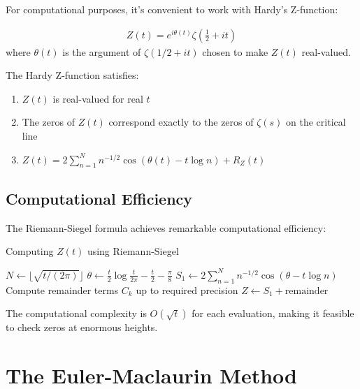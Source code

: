 For computational purposes, it's convenient to work with Hardy's Z-function:

\begin{definition}
\begin{align}
Z(t) = e^{i\theta(t)} \zeta\left(\frac{1}{2} + it\right)
\end{align}
where $\theta(t)$ is the argument of $\zeta(1/2 + it)$ chosen to make $Z(t)$ real-valued.
\end{definition}

\begin{theorem}
The Hardy Z-function satisfies:
\begin{enumerate}
\item $Z(t)$ is real-valued for real $t$
\item The zeros of $Z(t)$ correspond exactly to the zeros of $\zeta(s)$ on the critical line
\item $Z(t) = 2\sum_{n=1}^{N} n^{-1/2} \cos(\theta(t) - t\log n) + R_Z(t)$
\end{enumerate}
\end{theorem}

\subsection{Computational Efficiency}

The Riemann-Siegel formula achieves remarkable computational efficiency:

\begin{algorithm}[H]
\caption{Computing $Z(t)$ using Riemann-Siegel}
\begin{algorithmic}
\State $N \leftarrow \lfloor\sqrt{t/(2\pi)}\rfloor$
\State $\theta \leftarrow \frac{t}{2}\log\frac{t}{2\pi} - \frac{t}{2} - \frac{\pi}{8}$
\State $S_1 \leftarrow 2\sum_{n=1}^{N} n^{-1/2} \cos(\theta - t\log n)$
\State Compute remainder terms $C_k$ up to required precision
\State $Z \leftarrow S_1 + \text{remainder}$
\end{algorithmic}
\end{algorithm}

The computational complexity is $O(\sqrt{t})$ for each evaluation, making it feasible to check zeros at enormous heights.

\section{The Euler-Maclaurin Method}
\label{sec:euler-maclaurin}

